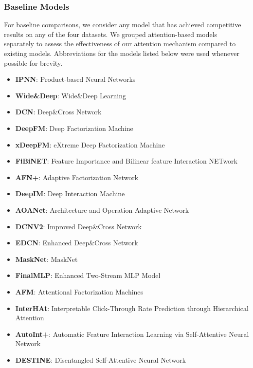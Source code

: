 \documentclass{article}
\begin{document}
\subsubsection{Baseline Models}

For baseline comparisons, we consider any model that has achieved competitive results on any of the four datasets. We grouped attention-based models separately to assess the effectiveness of our attention mechanism compared to existing models. Abbreviations for the models listed below were used whenever possible for brevity.

\begin{itemize}
  \item \textbf{IPNN}: Product-based Neural Networks \cite{pnn2016}
  \item \textbf{Wide\&Deep}: Wide\&Deep Learning \cite{cheng2016wide}
  \item \textbf{DCN}: Deep\&Cross Network \cite{deepcross2017}
  \item \textbf{DeepFM}: Deep Factorization Machine \cite{guo2017deepfm}
  \item \textbf{xDeepFM}: eXtreme Deep Factorization Machine \cite{lian2018xdeepfm}
  \item \textbf{FiBiNET}: Feature Importance and Bilinear feature Interaction NETwork \cite{fibinet2019}
  \item \textbf{AFN+}: Adaptive Factorization Network \cite{cheng2020adaptive}
  \item \textbf{DeepIM}: Deep Interaction Machine \cite{deepim2020}
  \item \textbf{AOANet}: Architecture and Operation Adaptive Network \cite{aoanet2020}
  \item \textbf{DCNV2}: Improved Deep\&Cross Network \cite{dcnv2}
  \item \textbf{EDCN}: Enhanced Deep\&Cross Network \cite{edcn2021}
  \item \textbf{MaskNet}: MaskNet \cite{masknet2021}
  \item \textbf{FinalMLP}: Enhanced Two-Stream MLP Model \cite{mao2023finalmlp}
  \item \textbf{AFM}: Attentional Factorization Machines \cite{afm2017}
  \item \textbf{InterHAt}: Interpretable Click-Through Rate Prediction through
Hierarchical Attention \cite{interhat2020}
  \item \textbf{AutoInt+}: Automatic Feature Interaction Learning via Self-Attentive Neural Network \cite{autoint2019}
  \item \textbf{DESTINE}: Disentangled Self-Attentive Neural Network \cite{destine2021}
\end{itemize}
\end{document}

